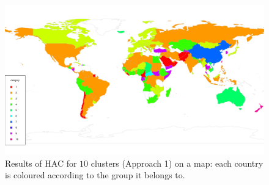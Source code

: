 \documentclass[a4paper,12pt]{article}
\numberwithin{equation}{section}
\begin{document}





\newpage 
\FloatBarrier
\begin{figure}[t!]
\begin{minipage}[t]{0.98\textwidth}
\includegraphics[width=\textwidth]{plots/14days/map_10cl}
\caption{Results of HAC for $10$ clusters (Approach 1) on a map: each country is coloured according to the group it belongs to.}\label{fig:map_10cl}
\end{minipage}
\end{figure}
\end{document}
